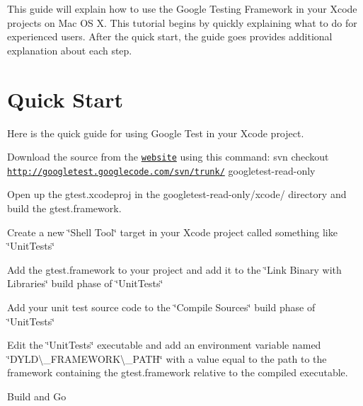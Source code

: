 This guide will explain how to use the Google Testing Framework in your Xcode projects on Mac OS X. This tutorial begins by quickly explaining what to do for experienced users. After the quick start, the guide goes provides additional explanation about each step.

\section*{Quick Start}

Here is the quick guide for using Google Test in your Xcode project.


\begin{DoxyEnumerate}
\item Download the source from the \href{http://code.google.com/p/googletest}{\tt website} using this command\+: {\ttfamily svn checkout \href{http://googletest.googlecode.com/svn/trunk/}{\tt http\+://googletest.\+googlecode.\+com/svn/trunk/} googletest-\/read-\/only}
\end{DoxyEnumerate}
\begin{DoxyEnumerate}
\item Open up the {\ttfamily gtest.\+xcodeproj} in the {\ttfamily googletest-\/read-\/only/xcode/} directory and build the gtest.\+framework.
\end{DoxyEnumerate}
\begin{DoxyEnumerate}
\item Create a new \char`\"{}\+Shell Tool\char`\"{} target in your Xcode project called something like \char`\"{}\+Unit\+Tests\char`\"{}
\end{DoxyEnumerate}
\begin{DoxyEnumerate}
\item Add the gtest.\+framework to your project and add it to the \char`\"{}\+Link Binary with Libraries\char`\"{} build phase of \char`\"{}\+Unit\+Tests\char`\"{}
\end{DoxyEnumerate}
\begin{DoxyEnumerate}
\item Add your unit test source code to the \char`\"{}\+Compile Sources\char`\"{} build phase of \char`\"{}\+Unit\+Tests\char`\"{}
\end{DoxyEnumerate}
\begin{DoxyEnumerate}
\item Edit the \char`\"{}\+Unit\+Tests\char`\"{} executable and add an environment variable named \char`\"{}\+D\+Y\+L\+D\textbackslash{}\+\_\+\+F\+R\+A\+M\+E\+W\+O\+R\+K\textbackslash{}\+\_\+\+P\+A\+T\+H\char`\"{} with a value equal to the path to the framework containing the gtest.\+framework relative to the compiled executable.
\end{DoxyEnumerate}
\begin{DoxyEnumerate}
\item Build and Go
\end{DoxyEnumerate}

